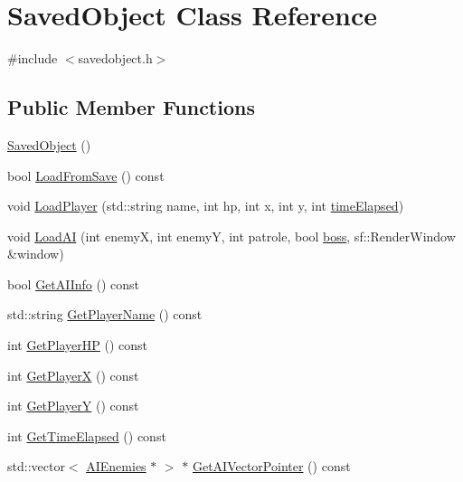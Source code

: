 \hypertarget{classSavedObject}{}\section{Saved\+Object Class Reference}
\label{classSavedObject}


{\ttfamily \#include $<$savedobject.\+h$>$}

\subsection*{Public Member Functions}
\begin{DoxyCompactItemize}
\item 
\hyperlink{classSavedObject_a4cf1d3e857699904e740c0dc4b551530}{Saved\+Object} ()
\item 
bool \hyperlink{classSavedObject_a442295468ec8970e357f56f264b8b253}{Load\+From\+Save} () const 
\item 
void \hyperlink{classSavedObject_aa92a4d6a7cddb1062ba1240df8d6922f}{Load\+Player} (std\+::string name, int hp, int x, int y, int \hyperlink{classSavedObject_a159f6863f00683638635cd784299d1b9}{time\+Elapsed})
\item 
void \hyperlink{classSavedObject_afdb01b608d0fc1826b55f4a2c4b0940f}{Load\+AI} (int enemyX, int enemyY, int patrole, bool \hyperlink{classSavedObject_ae1a2ed176b180bb0150d369baa59c75e}{boss}, sf\+::\+Render\+Window \&window)
\item 
bool \hyperlink{classSavedObject_a118e8fab767caa5a8288964d5979e443}{Get\+A\+I\+Info} () const 
\item 
std\+::string \hyperlink{classSavedObject_a6490504886dafe201eaa2c81b47e697c}{Get\+Player\+Name} () const 
\item 
int \hyperlink{classSavedObject_a848f34a0320688c945fc327af3e357cf}{Get\+Player\+HP} () const 
\item 
int \hyperlink{classSavedObject_ade1c165210cc9b69ed1b3dab85969640}{Get\+PlayerX} () const 
\item 
int \hyperlink{classSavedObject_ab3361faa4e657843775255df73273c16}{Get\+PlayerY} () const 
\item 
int \hyperlink{classSavedObject_a1ec2c3f0c70d429b4a71970b870f0c1d}{Get\+Time\+Elapsed} () const 
\item 
std\+::vector$<$ \hyperlink{classAIEnemies}{A\+I\+Enemies} $\ast$ $>$ $\ast$ \hyperlink{classSavedObject_a2b004f7724467e3ee35cd82354e4372b}{Get\+A\+I\+Vector\+Pointer} () const 
\end{DoxyCompactItemize}
